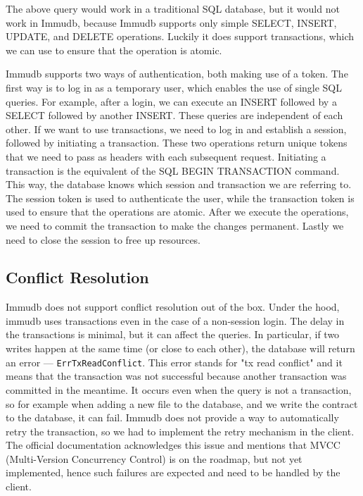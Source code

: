 The above query would work in a traditional SQL database, but it would not work in Immudb,
because Immudb supports only simple SELECT, INSERT, UPDATE, and DELETE operations.
Luckily it does support transactions, which we can use to ensure that the operation is atomic.

Immudb supports two ways of authentication, both making use of a token.
The first way is to log in as a temporary user, which enables the use of single SQL queries.
For example, after a login, we can execute an INSERT followed by a SELECT followed by another INSERT.
These queries are independent of each other.
If we want to use transactions, we need to log in and establish a session, followed by initiating a transaction.
These two operations return unique tokens that we need to pass as headers with each subsequent request.
Initiating a transaction is the equivalent of the SQL BEGIN TRANSACTION command.
This way, the database knows which session and transaction we are referring to.
The session token is used to authenticate the user,
while the transaction token is used to ensure that the operations are atomic.
After we execute the operations, we need to commit the transaction to make the changes permanent.
Lastly we need to close the session to free up resources.

\subsection{Conflict Resolution}

Immudb does not support conflict resolution out of the box.
Under the hood, immudb uses transactions even in the case of a non-session login.
The delay in the transactions is minimal, but it can affect the queries.
In particular, if two writes happen at the same time (or close to each other),
the database will return an error --- \texttt{ErrTxReadConflict}.
This error stands for "tx read conflict" and it means that the transaction was not successful
because another transaction was committed in the meantime.
It occurs even when the query is not a transaction,
so for example when adding a new file to the database, and we write the contract to the database, it can fail.
Immudb does not provide a way to automatically retry the transaction,
so we had to implement the retry mechanism in the client.
The official documentation acknowledges this issue and mentions that MVCC (Multi-Version Concurrency Control)
is on the roadmap, but not yet implemented, hence such failures are expected and need to be handled by the client.

